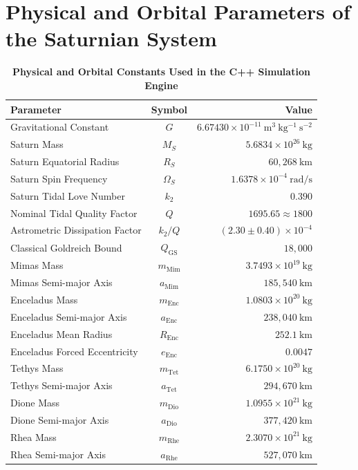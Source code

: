 \documentclass[11pt,a4paper]{article}
\begin{document}
\section{Physical and Orbital Parameters of the Saturnian System}
\begin{table}[H]
\centering
\caption{\textbf{Physical and Orbital Constants Used in the C++ Simulation Engine}}
\label{tab:constants}
\vspace{0.5em}
\begin{tabular}{lcr}
\toprule
\textbf{Parameter} & \textbf{Symbol} & \textbf{Value} \\
\midrule
Gravitational Constant & $G$ & $6.67430 \times 10^{-11}\ \mathrm{m^3\ kg^{-1}\ s^{-2}}$ \\
Saturn Mass & $M_S$ & $5.6834 \times 10^{26}\ \mathrm{kg}$ \\
Saturn Equatorial Radius & $R_S$ & $60{,}268\ \mathrm{km}$ \\
Saturn Spin Frequency & $\Omega_S$ & $1.6378 \times 10^{-4}\ \mathrm{rad/s}$ \\
Saturn Tidal Love Number & $k_2$ & $0.390$ \\
Nominal Tidal Quality Factor & $Q$ & $1695.65 \approx 1800$ \\
Astrometric Dissipation Factor & $k_2 / Q$ & $(2.30 \pm 0.40) \times 10^{-4}$ \\
Classical Goldreich Bound & $Q_{\mathrm{GS}}$ & $18{,}000$ \\
Mimas Mass & $m_{\mathrm{Mim}}$ & $3.7493 \times 10^{19}\ \mathrm{kg}$ \\
Mimas Semi-major Axis & $a_{\mathrm{Mim}}$ & $185{,}540\ \mathrm{km}$ \\
Enceladus Mass & $m_{\mathrm{Enc}}$ & $1.0803 \times 10^{20}\ \mathrm{kg}$ \\
Enceladus Semi-major Axis & $a_{\mathrm{Enc}}$ & $238{,}040\ \mathrm{km}$ \\
Enceladus Mean Radius & $R_{\mathrm{Enc}}$ & $252.1\ \mathrm{km}$ \\
Enceladus Forced Eccentricity & $e_{\mathrm{Enc}}$ & $0.0047$ \\
Tethys Mass & $m_{\mathrm{Tet}}$ & $6.1750 \times 10^{20}\ \mathrm{kg}$ \\
Tethys Semi-major Axis & $a_{\mathrm{Tet}}$ & $294{,}670\ \mathrm{km}$ \\
Dione Mass & $m_{\mathrm{Dio}}$ & $1.0955 \times 10^{21}\ \mathrm{kg}$ \\
Dione Semi-major Axis & $a_{\mathrm{Dio}}$ & $377{,}420\ \mathrm{km}$ \\
Rhea Mass & $m_{\mathrm{Rhe}}$ & $2.3070 \times 10^{21}\ \mathrm{kg}$ \\
Rhea Semi-major Axis & $a_{\mathrm{Rhe}}$ & $527{,}070\ \mathrm{km}$ \\
\bottomrule
\end{tabular}
\end{table}
\end{document}
